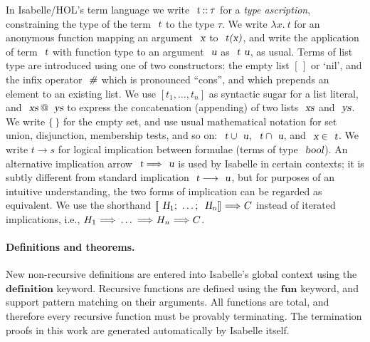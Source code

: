 In Isabelle/HOL's term language we write $\isa{t} \mathbin{::} \tau$ for a \emph{type ascription}, constraining the type of the term $\isa{t}$ to the type $\tau$.
We write $\lambda{x}.\: t$ for an anonymous function mapping an argument $\isa{x}$ to $\isa{t(x)}$, and write the application of term $\isa{t}$ with function type to an argument $\isa{u}$ as $\isa{t\ u}$, as usual.
Terms of list type are introduced using one of two constructors: the empty list $[\,]$ or `nil', and the infix operator $\isa{\#}$ which is pronounced ``cons'', and which prepends an element to an existing list.
We use $[t_1, \ldots, t_n]$ as syntactic sugar for a list literal, and $\isa{xs} \mathbin{\isacharat} \isa{ys}$ to express the concatenation (appending) of two lists $\isa{xs}$ and $\isa{ys}$.
We write $\{\,\}$ for the empty set, and use usual mathematical notation for set union, disjunction, membership tests, and so on: $\isa{t} \cup \isa{u}$, $\isa{t} \cap \isa{u}$, and $\isa{x} \in \isa{t}$.
We write $t \longrightarrow s$ for logical implication between formulae (terms of type $\isa{bool}$).
An alternative implication arrow $\isa{t} \Longrightarrow \isa{u}$ is used by Isabelle in certain contexts; it is subtly different from standard implication $\isa{t} \longrightarrow \isa{u}$, but for purposes of an intuitive understanding, the two forms of implication can be regarded as equivalent.
We use the shorthand ${\isasymlbrakk}\isa{H}_1{\isacharsemicolon}\ \ldots{\isacharsemicolon}\ \isa{H}_n{\isasymrbrakk}\ {\isasymLongrightarrow}\ C$ instead of iterated implications, i.e., $H_1\ {\isasymLongrightarrow}\ \ldots\ {\isasymLongrightarrow}\ H_n\ {\isasymLongrightarrow}\ C$.

\paragraph{Definitions and theorems.}

New non-recursive definitions are entered into Isabelle's global context using the $\mathbf{definition}$ keyword.
Recursive functions are defined using the $\mathbf{fun}$ keyword, and support pattern matching on their arguments.
All functions are total, and therefore every recursive function must be provably terminating.
The termination proofs in this work are generated automatically by Isabelle itself.

